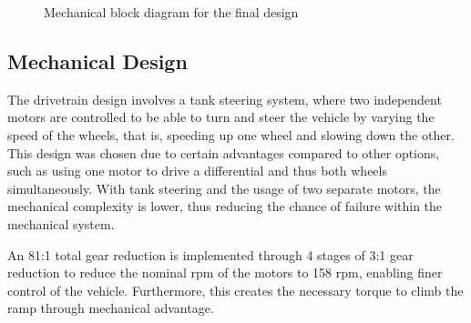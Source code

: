 \documentclass[11pt]{article}
\begin{document}
\begin{figure}
    \centering
    \caption{Mechanical block diagram for the final design}
    \label{fig:mbd2}
\end{figure}

\subsection{Mechanical Design}
The drivetrain design involves a tank steering system, where two independent motors are controlled to be able to turn and steer the vehicle by varying the speed of the wheels, that is, speeding up one wheel and slowing down the other. This design was chosen due to certain advantages compared to other options, such as using one motor to drive a differential and thus both wheels simultaneously. With tank steering and the usage of two separate motors, the mechanical complexity is lower, thus reducing the chance of failure within the mechanical system.

An 81:1 total gear reduction is implemented through 4 stages of 3:1 gear reduction to reduce the nominal rpm of the motors to 158 rpm, enabling finer control of the vehicle. Furthermore, this creates the necessary torque to climb the ramp through mechanical advantage.
\end{document}
